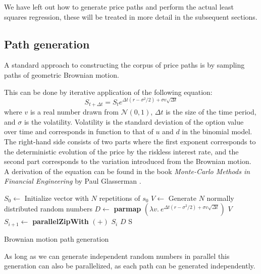 We have left out how to generate price paths and perform the actual
least squares regression, these will be treated in more detail in the
subsequent sections.

\subsection{Path generation}
\label{subsec:path-generation}
A standard approach to constructing the corpus of price paths is by
sampling paths of geometric Brownian motion.

This can be done by iterative application of the following equation:
$$S_{t+\Delta t}=S_te^{\Delta t(r-\sigma^2/2) + \sigma v\sqrt{\Delta t}}$$ where
$v$ is a real number drawn from $\mathcal{N}(0,1)$, $\Delta t$ is the
size of the time period, and $\sigma$ is the volatility. Volatility is
the standard deviation of the option value over time and corresponds
in function to that of $u$ and $d$ in the binomial model. The
right-hand side consists of two parts where the first exponent
corresponds to the deterministic evolution of the price by the
riskless interest rate, and the second part corresponds to the
variation introduced from the Brownian motion. A derivation of the
equation can be found in the book \emph{Monte-Carlo Methods in
  Financial Engineering} by Paul Glasserman \cite[Section
3.2]{glasserman2003monte}.

\begin{algorithm}
  \begin{algorithmic}
    \State $S_0 \gets$ Initialize vector with $N$ repetitions of $s_0$
      \State $V \gets$ Generate $N$ normally distributed random numbers
      \State $D \gets$ \textbf{parmap} $(\lambda v.\ e^{\Delta t(r-\sigma^2/2) + \sigma v\sqrt{\Delta t}})$ $V$
      \State $S_{i+1} \gets$ \textbf{parallelZipWith} $(+)$ $S_{i}$ $D$
    \EndFor
    \State \Return S
    \EndFunction
  \end{algorithmic}
  \caption{Brownian motion path generation}
  \label{alg:lsm-pathgeneration}
\end{algorithm}


As long as we can generate independent random numbers in parallel this
generation can also be parallelized, as each path can be generated
independently.

